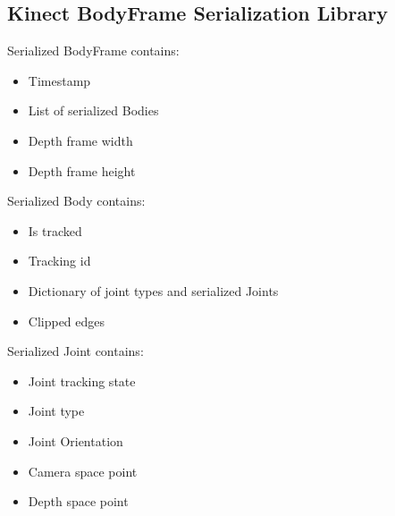 \documentclass{sigchi}
\begin{document}
\newpage
\begin{appendices}

\section{Kinect BodyFrame Serialization Library}
\label{sec:bodyframe_serialization}

Serialized BodyFrame contains:

\begin{itemize}
  \item Timestamp
  \item List of serialized Bodies
  \item Depth frame width
  \item Depth frame height
\end{itemize}

Serialized Body contains:

\begin{itemize}
  \item Is tracked
  \item Tracking id
  \item Dictionary of joint types and serialized Joints
  \item Clipped edges
\end{itemize}

Serialized Joint contains:

\begin{itemize}
  \item Joint tracking state
  \item Joint type
  \item Joint Orientation
  \item Camera space point
  \item Depth space point
\end{itemize}

\end{appendices}
\end{document}
